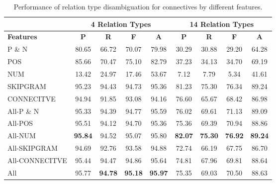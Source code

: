 \begin{table}[ht]
\centering
\begin{tabular}{|l|c|c|c|c|c|c|c|c|}
\hline
                  & \multicolumn{4}{c|}{4 Relation Types}      & \multicolumn{4}{c|}{14 Relation Types}                                    \\ \hline
\bf Features      & \bf P         & \bf R      & \bf F         & \bf A         & \bf P         & \bf R      & \bf F        & \bf A         \\ \hline
    P \& N        &     80.65     &     66.72  &     70.07     &     79.98     &     30.29     &     30.88  &     29.20    &     64.28     \\ \hline
    POS           &     85.66     &     70.47  &     75.10     &     82.79     &     37.23     &     34.13  &     34.70    &     69.19     \\ \hline
    NUM           &     13.42     &     24.97  &     17.46     &     53.67     &      7.12     &      7.79  &      5.34    &     41.61     \\ \hline
    SKIPGRAM      &     95.23     &     94.43  &     94.73     &     95.36     &     81.23     &     75.30  &     76.34    &     89.24     \\ \hline
    CONNECITVE    &     94.94     &     91.85  &     93.08     &     94.16     &     76.60     &     65.67  &     68.42    &     86.98     \\ \hline
    All-P \& N    &     95.33     &     94.39  &     94.77     &     95.59     &     76.02     &     69.61  &     71.13    &     89.09     \\ \hline
    All-POS       &     95.51     &     94.12  &     94.70     &     95.36     &     75.36     &     69.39  &     70.94    &     88.86     \\ \hline
    All-NUM       & \bf 95.84     &     94.52  &     95.07     &     95.80     & \bf 82.07     & \bf 75.30  & \bf 76.92    & \bf 89.24     \\ \hline
    All-SKIPGRAM  &     94.69     &     92.76  &     93.58     &     94.88     &     72.74     &     66.19  &     67.75    &     86.70     \\ \hline
    All-CONNECITVE&     95.44     &     94.47  &     94.86     &     95.64     &     74.81     &     67.96  &     69.81    &     88.64     \\ \hline
    All           &     95.77     & \bf 94.78  & \bf 95.18     & \bf 95.97     &     75.35     &     69.03  &     70.50    &     88.63     \\ \hline

\end{tabular}
\caption{\label{t:sense-features} Performance of relation type
disambiguation for connectives by different features. }
\end{table}


